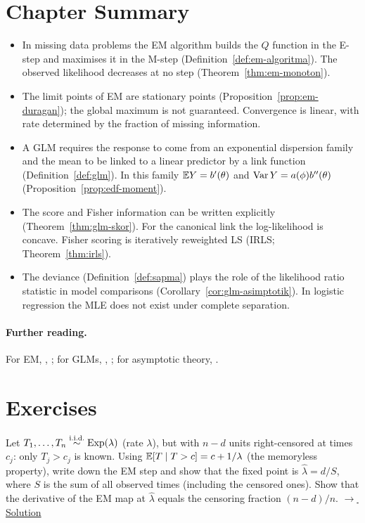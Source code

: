 \documentclass[main.tex]{subfiles}
\begin{document}
\section{Chapter Summary}
\begin{summary}
\begin{itemize}
  \item In missing data problems the EM algorithm builds the $Q$ function in the E-step and maximises it in the M-step (Definition~\ref{def:em-algoritma}). The observed likelihood decreases at no step (Theorem~\ref{thm:em-monoton}).
  \item The limit points of EM are stationary points (Proposition~\ref{prop:em-duragan}); the global maximum is not guaranteed. Convergence is linear, with rate determined by the fraction of missing information.
  \item A GLM requires the response to come from an exponential dispersion family and the mean to be linked to a linear predictor by a link function (Definition~\ref{def:glm}). In this family $\mathbb{E} Y=b'(\theta)$ and $\operatorname{Var} Y=a(\phi)b''(\theta)$ (Proposition~\ref{prop:edf-moment}).
  \item The score and Fisher information can be written explicitly (Theorem~\ref{thm:glm-skor}). For the canonical link the log-likelihood is concave. Fisher scoring is iteratively reweighted LS (IRLS; Theorem~\ref{thm:irls}).
  \item The deviance (Definition~\ref{def:sapma}) plays the role of the likelihood ratio statistic in model comparisons (Corollary~\ref{cor:glm-asimptotik}). In logistic regression the MLE does not exist under complete separation.
\end{itemize}
\end{summary}

\paragraph{Further reading.} For EM, \cite{dempster77}, \cite{mclachlan08}; for GLMs, \cite{mccullagh-nelder89}, \cite[Chapter~13]{wasserman}; for asymptotic theory, \cite[Chapter~5]{vdv}.

\section{Exercises}

\begin{exercise}\label{exr:23-1}
Let $T_1,\dots,T_n\overset{\text{i.i.d.}}{\sim}\text{Exp}(\lambda)$ (rate $\lambda$), but with $n-d$ units right-censored at times $c_j$: only $T_j>c_j$ is known. Using $\mathbb{E}[T\mid T>c]=c+1/\lambda$ (the memoryless property), write down the EM step and show that the fixed point is $\hat\lambda=d/S$, where $S$ is the sum of all observed times (including the censored ones). Show that the derivative of the EM map at $\hat\lambda$ equals the censoring fraction $(n-d)/n$.
\hfill\hyperref[coz:23-1]{\footnotesize$\rightarrow$\,Solution}
\end{exercise}
\end{document}
